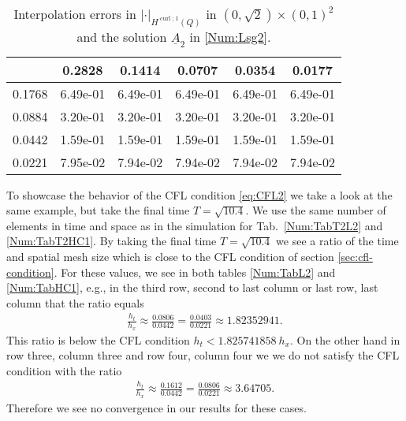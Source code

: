 \documentclass[a4paper,11pt]{article}
\newcommand{\cu}{\operatorname{curl}}
\renewcommand{\vec}[1]{\underline{#1}}
\newcommand{\abs}[1]{\left\lvert{#1}\right\rvert}
\begin{document}
\begin{table}
	\begin{center}
	\caption{Interpolation errors in $\abs{\cdot}_{H^{\cu;1}(Q)}$  in $(0,\sqrt{2})\times(0,1)^2$ and the solution $\vec A_2$ in \eqref{Num:Lsg2}.}
	\begin{tabular}{c|ccccc}
	\diagbox{$h_x$}{\vspace*{-.1cm}$h_t$}&    0.2828&  0.1414 & 0.0707 &  0.0354 &  0.0177 \\
		\hline\hline
		0.1768 & 6.49e-01 & 6.49e-01 & 6.49e-01 & 6.49e-01 & 6.49e-01 \\
		0.0884 & 3.20e-01 & 3.20e-01 & 3.20e-01 & 3.20e-01 & 3.20e-01 \\
		0.0442 & 1.59e-01 & 1.59e-01 & 1.59e-01 & 1.59e-01 & 1.59e-01 \\
		0.0221 & 7.95e-02 & 7.94e-02 & 7.94e-02 & 7.94e-02 & 7.94e-02 \\
	\end{tabular}
	\label{Num:InterpT2HC1}	
	\end{center}
\end{table}
To showcase the behavior of the CFL condition \eqref{eq:CFL2} we take a look at the same example, but take the final time $T=\sqrt{10.4}$. We use the same number of elements in time and space as in the simulation for Tab.~\ref{Num:TabT2L2} and \ref{Num:TabT2HC1}. By taking the final time $T=\sqrt{10.4}$ we see a ratio of the time and spatial mesh size which is close to the CFL condition of section \ref{sec:cfl-condition}. For these values, we see  in both tables \ref{Num:TabL2} and \ref{Num:TabHC1}, e.g., in the third row, second to last column or last row, last column that the ratio  {equals}
\begin{align*}
	\frac{h_t}{h_x} \approx 	\frac{0.0806}{0.0442} = \frac{0.0403}{0.0221}  \approx 1.82352941.
\end{align*}
This ratio is below the CFL condition 	$h_t  < 1.825741858\ h_x.$ On the other hand in row three, column three and row four, column four we we do not satisfy the CFL condition with the ratio 
\begin{align*}
	\frac{h_t}{h_x} \approx 	\frac{0.1612}{0.0442} = \frac{0.0806}{0.0221}  \approx 3.64705.
\end{align*}
Therefore we see no convergence in our results for these cases.
\end{document}
